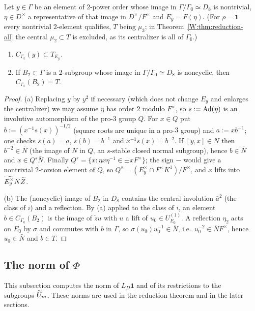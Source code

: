 \begin{lemma}\label{W:lem:centralizers}
Let $y\in\Gamma$ be an element of $2$-power order whose image in
$\Gamma/\Gamma_0\simeq D_8$ is nontrivial, $\eta\in D^\times$ a
representative of that image in $D^\times/F^\times$ and $E_y=F(\eta)$.
(For $\rho=\mathbf1$ every nontrivial $2$-element qualifies, $T$ being
$\mu_3$; in Theorem~\ref{W:thm:reduction-all} the central $\mu_2\subset T$
is excluded, as its centralizer is all of $\Gamma_0$.)
\begin{enumerate}[label=(\alph*)]
\item $C_{\Gamma_0}(y)\subset T_{E_y}$.
\item If $B_2\subset\Gamma$ is a $2$-subgroup whose image in
$\Gamma/\Gamma_0\simeq D_8$ is noncyclic, then $C_{\Gamma_0}(B_2)=T$.
\end{enumerate}
\end{lemma}
\begin{proof}
(a) Replacing $y$ by $y^2$ if necessary (which does not change $E_y$ and
enlarges the centralizer) we may assume $\eta$ has order $2$ modulo
$F^\times$, so $s:=\operatorname{Ad}(\eta)$ is an involutive automorphism of the
pro-$3$ group $Q$.  For $x\in Q$ put $b:=(x^{-1}s(x))^{-1/2}$ (square
roots are unique in a pro-$3$ group) and $a:=xb^{-1}$; one checks
$s(a)=a$, $s(b)=b^{-1}$ and $x^{-1}s(x)=b^{-2}$.  If
$[y,x]\in N$ then $b^{-2}\in\bar N$ (the image of $N$ in $Q$, an
$s$-stable closed normal subgroup), hence $b\in\bar N$ and
$x\in Q^s\bar N$.  Finally $Q^s=\{x:\eta x\eta^{-1}\in\pm xF^\times\}$;
the sign $-$ would give a nontrivial $2$-torsion element of $Q$, so
$Q^s=(E_y^\times\cap F^\times K^1)/F^\times$, and $x$ lifts into
$\widetilde{E_y^\times}N\widetilde Z$.

(b) The (noncyclic) image of $B_2$ in $D_8$ contains the central involution
$\bar a^2$ (the class of $i$) and a reflection.  By (a) applied to the
class of $i$, an element $b\in C_{\Gamma_0}(B_2)$ is the image of
$\tilde zu$ with $u$ a lift of $u_0\in U^{(1)}_{E_0}$.  A reflection $\eta_2$
acts on $E_0$ by $\sigma$ and commutes with $b$ in $\Gamma$, so
$\sigma(u_0)u_0^{-1}\in\bar N$, i.e.\ $u_0^{-2}\in\bar N F^\times$,
hence $u_0\in\bar N$ and $b\in T$.
\end{proof}

\subsection{The norm of $\Phi$}
This subsection computes the norm of $L_D\mathbf1$ and of its restrictions to the subgroups $\widetilde U_m$. These norms are used in the reduction theorem and in the later sections.

